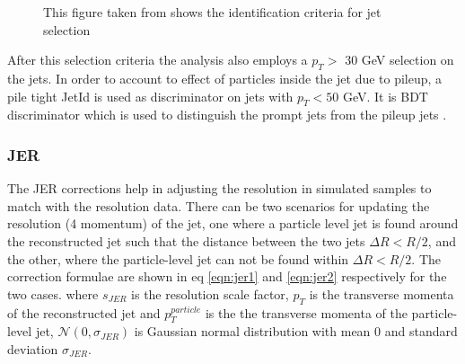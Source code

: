 \begin{figure}%
    \centering

    \qquad
    \qquad
    \caption{This figure taken from \cite{jetidentification} shows the identification criteria for jet selection}%
    \label{analysis:jet-id}%
\end{figure}

After this selection criteria the analysis also employs a $p_{T}>$ 30 GeV selection on the jets. In order to account to effect of particles inside the jet due to pileup, a pile tight JetId is used as discriminator on jets with $p_{T}< 50$ GeV. It is BDT discriminator which is used to distinguish the prompt jets from the pileup jets \cite{puid}.
\subsubsection{JER}\label{jer}
The JER corrections help in adjusting the resolution in simulated samples to match with the resolution data. There can be two scenarios for updating the resolution (4 momentum) of the jet, one where a particle level jet is found around the reconstructed jet such that the distance between the two jets $\Delta R < R/2$, and the other, where the particle-level jet can not be found within $\Delta R < R/2$. The correction formulae are shown in eq \ref{eqn:jer1} and \ref{eqn:jer2} respectively for the two cases. where $s_{JER}$ is the resolution scale factor, $p_{T}$ is the transverse momenta of the reconstructed jet and $p_{T}^{particle}$ is the the transverse momenta of the particle-level jet, $\mathcal{N}\left(0, \sigma_{JER}\right)$ is Gaussian normal distribution with mean 0 and standard deviation $\sigma_{JER}$. 

